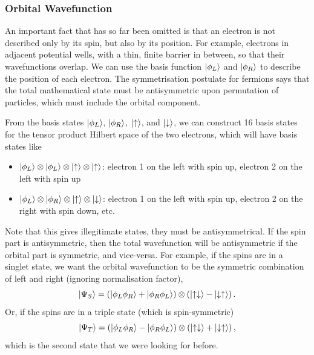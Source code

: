 \documentclass{article}
\begin{document}
\subsubsection{Orbital Wavefunction}
An important fact that has so far been omitted is that an electron is not described only by its spin, but also by its position. For example, electrons in adjacent potential wells, with a thin, finite barrier in between, so that their wavefunctions overlap. We can use the basis function $\ket{\phi _L}$ and $\ket{\phi _R}$ to describe the position of each electron. The symmetrisation postulate for fermions says that the total mathematical state must be antisymmetric upon permutation of particles, which must include the orbital component.

From the basis states $\ket{\phi _L}$, $\ket{\phi _R}$, $\ket{\uparrow}$, and $\ket{\downarrow}$, we can construct 16 basis states for the tensor product Hilbert space of the two electrons, which will have basis states like
\begin{itemize}
    \item $\ket{\phi _L}\otimes \ket{\phi _L}\otimes \ket{\uparrow}\otimes \ket{\uparrow}$: electron 1 on the left with spin up, electron 2 on the left with spin up
    \item $\ket{\phi _L}\otimes \ket{\phi _R}\otimes \ket{\uparrow}\otimes \ket{\downarrow}$: electron 1 on the left with spin up, electron 2 on the right with spin down, etc.
\end{itemize}
Note that this gives illegitimate states, they must be antisymmetrical. If the spin part is antisymmetric, then the total wavefunction will be antisymmetric if the orbital part is symmetric, and vice-versa. For example, if the spins are in a singlet state, we want the orbital wavefunction to be the symmetric combination of left and right (ignoring normalisation factor), 
\[
    \ket{\Psi _S}=\left( \ket{\phi _L\phi _R}+\ket{\phi _R\phi _L} \right)\otimes \left( \ket{\uparrow \downarrow}-\ket{\downarrow \uparrow} \right).
\]
Or, if the spins are in a triple state (which is spin-symmetric)
\[
    \ket{\Psi _T}=\left( \ket{\phi _L\phi _R}-\ket{\phi _R\phi _L} \right)\otimes \left( \ket{\uparrow \downarrow}+\ket{\downarrow \uparrow} \right),
\]
which is the second state that we were looking for before.
\end{document}
